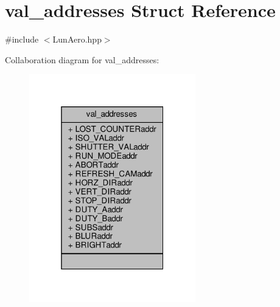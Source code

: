 \hypertarget{structval__addresses}{}\section{val\+\_\+addresses Struct Reference}
\label{structval__addresses}


{\ttfamily \#include $<$Lun\+Aero.\+hpp$>$}



Collaboration diagram for val\+\_\+addresses\+:\nopagebreak
\begin{figure}[H]
\begin{center}
\leavevmode
\includegraphics[width=205pt]{structval__addresses__coll__graph}
\end{center}
\end{figure}
